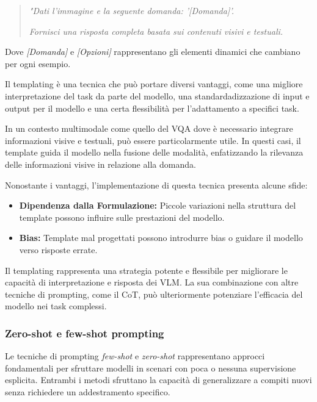 \documentclass[../main.tex]{subfiles}
\begin{document}
\begin{quote}
    \textit{"Dati l'immagine e la seguente domanda: '[Domanda]'.}
    
    \textit{Fornisci una risposta completa basata sui contenuti visivi e testuali.} 
    
\end{quote}
Dove \textit{[Domanda]} e \textit{[Opzioni]} rappresentano gli elementi dinamici che cambiano per ogni esempio.

Il templating è una tecnica che può portare diversi vantaggi, come una migliore interpretazione del task da parte del modello, una standardadizzazione di input e output per il modello e una certa flessibilità per l'adattamento a specifici task.

In un contesto multimodale come quello del VQA dove è necessario integrare informazioni visive e testuali, può essere particolarmente utile. In questi casi, il template guida il modello nella fusione delle modalità, enfatizzando la rilevanza delle informazioni visive in relazione alla domanda.

Nonostante i vantaggi, l'implementazione di questa tecnica presenta alcune sfide:
\begin{itemize}
    \item \textbf{Dipendenza dalla Formulazione:} Piccole variazioni nella struttura del template possono influire sulle prestazioni del modello.
    \item \textbf{Bias:} Template mal progettati possono introdurre bias o guidare il modello verso risposte errate.
\end{itemize}

Il templating rappresenta una strategia potente e flessibile per migliorare le capacità di interpretazione e risposta dei VLM. La sua combinazione con altre tecniche di prompting, come il CoT, può ulteriormente potenziare l'efficacia del modello nei task complessi.

\subsubsection{Zero-shot e few-shot prompting}

Le tecniche di prompting \textit{few-shot} e \textit{zero-shot} rappresentano approcci fondamentali per sfruttare modelli in scenari con poca o nessuna supervisione esplicita. Entrambi i metodi sfruttano la capacità di generalizzare a compiti nuovi senza richiedere un addestramento specifico.
\end{document}
